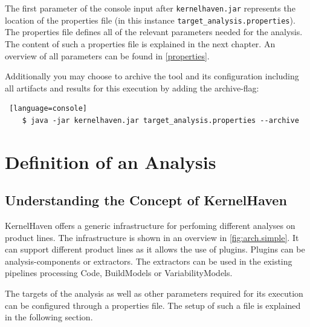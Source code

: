 The first parameter of the console input after \texttt{kernelhaven.jar}  represents the location of the properties file (in this instance \texttt{target\_analysis.properties}). The properties file defines all of the relevant parameters needed for the analysis. The content of such a properties file is explained in the next chapter. An overview of all parameters can be found in \autoref{properties}.

Additionally you may choose to archive the tool and its configuration including all artifacts and results for this execution by adding the archive-flag:

\begin{lstlisting} [language=console]
    $ java -jar kernelhaven.jar target_analysis.properties --archive
\end{lstlisting}


\chapter{Definition of an Analysis}

\section{Understanding the Concept of KernelHaven}

KernelHaven offers a generic infrastructure for perfoming different analyses on product lines. The infrastructure is shown in an overview in \autoref{fig:arch.simple}.  It can support different product lines as it allows the use of plugins. Plugins can be analysis-components or extractors. The extractors can be used in the existing pipelines processing Code, BuildModels  or VariabilityModels. 

The targets of the analysis as well as other parameters required for its execution can be configured through a properties file. The setup of such a file is explained in the following section.

